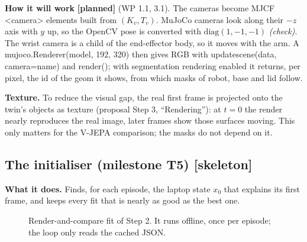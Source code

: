 \documentclass[11pt,a4paper]{article}
\newcommand{\skel}{\textcolor{skelamber}{\textbf{[skeleton]}}}
\newcommand{\planned}{\textcolor{plangray}{\textbf{[planned]}}}
\newcommand{\chk}{\textit{(check)}}
\newcommand{\code}[1]{{\small\ttfamily\begingroup\def\_{\textunderscore\allowbreak}\def\/{/\allowbreak}#1\endgroup}}
\newcommand{\X}{\mathcal X}
\begin{document}
\textbf{How it will work} \planned{} (WP 1.1, 3.1). The cameras become MJCF \code{<camera>} elements built from $(K_v,T_v)$. MuJoCo cameras look along their $-z$ axis with $y$ up, so the OpenCV pose is converted with $\mathrm{diag}(1,-1,-1)$ \chk. The wrist camera is a child of the end-effector body, so it moves with the arm. A \code{mujoco.Renderer(model, 192, 320)} then gives RGB with \code{update\_scene(data, camera=name)} and \code{render()}; with segmentation rendering enabled it returns, per pixel, the id of the geom it shows, from which masks of robot, base and lid follow.

\textbf{Texture.} To reduce the visual gap, the real first frame is projected onto the twin's objects as texture (proposal Step 3, ``Rendering''): at $t=0$ the render nearly reproduces the real image, later frames show those surfaces moving. This only matters for the V-JEPA comparison; the masks do not depend on it.

\subsection{The initialiser (milestone T5) \skel}\label{sec:init}
\textbf{What it does.} Finds, for each episode, the laptop state $x_0$ that explains its first frame, and keeps every fit that is nearly as good as the best one.

\begin{figure}[h]
\centering
{}
\caption{Render-and-compare fit of Step 2. It runs offline, once per episode; the loop only reads the cached JSON.}
\label{fig:init}
\end{figure}
\end{document}
